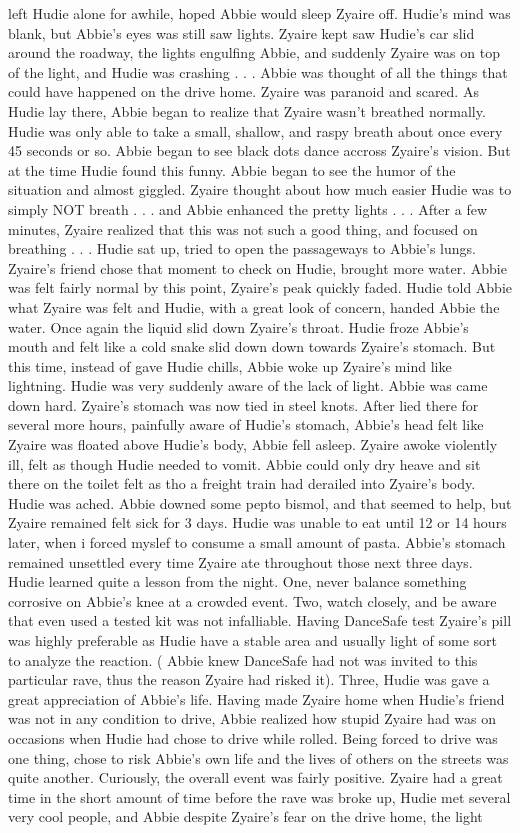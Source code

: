 \documentclass[12pt]{book}
\begin{document}
left Hudie alone for awhile, hoped Abbie would sleep Zyaire off. Hudie's mind was blank, but Abbie's eyes was still saw lights. Zyaire kept saw Hudie's car slid around the roadway, the lights engulfing Abbie, and suddenly Zyaire was on top of the light, and Hudie was crashing . . .  Abbie was thought of all the things that could have happened on the drive home. Zyaire was paranoid and scared. As Hudie lay there, Abbie began to realize that Zyaire wasn't breathed normally. Hudie was only able to take a small, shallow, and raspy breath about once every 45 seconds or so. Abbie began to see black dots dance accross Zyaire's vision. But at the time Hudie found this funny. Abbie began to see the humor of the situation and almost giggled. Zyaire thought about how much easier Hudie was to simply NOT breath . . .  and Abbie enhanced the pretty lights . . .  After a few minutes, Zyaire realized that this was not such a good thing, and focused on breathing . . .  Hudie sat up, tried to open the passageways to Abbie's lungs. Zyaire's friend chose that moment to check on Hudie, brought more water. Abbie was felt fairly normal by this point, Zyaire's peak quickly faded. Hudie told Abbie what Zyaire was felt and Hudie, with a great look of concern, handed Abbie the water. Once again the liquid slid down Zyaire's throat. Hudie froze Abbie's mouth and felt like a cold snake slid down down towards Zyaire's stomach. But this time, instead of gave Hudie chills, Abbie woke up Zyaire's mind like lightning. Hudie was very suddenly aware of the lack of light. Abbie was came down hard. Zyaire's stomach was now tied in steel knots. After lied there for several more hours, painfully aware of Hudie's stomach, Abbie's head felt like Zyaire was floated above Hudie's body, Abbie fell asleep. Zyaire awoke violently ill, felt as though Hudie needed to vomit. Abbie could only dry heave and sit there on the toilet felt as tho a freight train had derailed into Zyaire's body. Hudie was ached. Abbie downed some pepto bismol, and that seemed to help, but Zyaire remained felt sick for 3 days. Hudie was unable to eat until 12 or 14 hours later, when i forced myslef to consume a small amount of pasta. Abbie's stomach remained unsettled every time Zyaire ate throughout those next three days. Hudie learned quite a lesson from the night. One, never balance something corrosive on Abbie's knee at a crowded event. Two, watch closely, and be aware that even used a tested kit was not infalliable. Having DanceSafe test Zyaire's pill was highly preferable as Hudie have a stable area and usually light of some sort to analyze the reaction. ( Abbie knew DanceSafe had not was invited to this particular rave, thus the reason Zyaire had risked it). Three, Hudie was gave a great appreciation of Abbie's life. Having made Zyaire home when Hudie's friend was not in any condition to drive, Abbie realized how stupid Zyaire had was on occasions when Hudie had chose to drive while rolled. Being forced to drive was one thing, chose to risk Abbie's own life and the lives of others on the streets was quite another. Curiously, the overall event was fairly positive. Zyaire had a great time in the short amount of time before the rave was broke up, Hudie met several very cool people, and Abbie despite Zyaire's fear on the drive home, the light 
\end{document}
